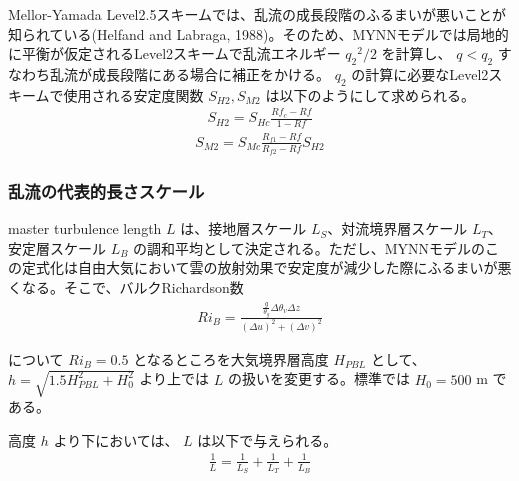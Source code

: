 Mellor-Yamada
Level2.5スキームでは、乱流の成長段階のふるまいが悪いことが知られている(Helfand
and Labraga,
1988)。そのため、MYNNモデルでは局地的に平衡が仮定されるLevel2スキームで乱流エネルギー
\({q_2}^2/2\) を計算し、 \(q<q_2\)
すなわち乱流が成長段階にある場合に補正をかける。 \(q_2\)
の計算に必要なLevel2スキームで使用される安定度関数 \(S_{H2},S_{M2}\)
は以下のようにして求められる。 \begin{eqnarray}S_{H2}=S_{Hc}\frac{Rf_c-Rf}{1-Rf}\end{eqnarray}
\begin{eqnarray}S_{M2}=S_{Mc}\frac{R_{f1}-Rf}{R_{f2}-Rf}S_{H2}\end{eqnarray}

\hypertarget{ux4e71ux6d41ux306eux4ee3ux8868ux7684ux9577ux3055ux30b9ux30b1ux30fcux30eb}{%
\subsubsection{乱流の代表的長さスケール}\label{ux4e71ux6d41ux306eux4ee3ux8868ux7684ux9577ux3055ux30b9ux30b1ux30fcux30eb}}

master turbulence length \(L\) は、接地層スケール
\(L_S\)、対流境界層スケール \(L_T\)、安定層スケール \(L_B\)
の調和平均として決定される。ただし、MYNNモデルのこの定式化は自由大気において雲の放射効果で安定度が減少した際にふるまいが悪くなる。そこで、バルクRichardson数
\begin{eqnarray}Ri_B=\frac{\frac{g}{\theta_g}\Delta\theta_v\Delta z}{(\Delta u)^2+(\Delta v)^2}\end{eqnarray}

について \(Ri_B=0.5\) となるところを大気境界層高度 \(H_{PBL}\) として、
\(h=\sqrt{1.5H_{PBL}^2+H_0^2}\) より上では \(L\)
の扱いを変更する。標準では \(H_0=500\) m である。

高度 \(h\) より下においては、 \(L\) は以下で与えられる。
\begin{eqnarray}\frac{1}{L}=\frac{1}{L_S}+\frac{1}{L_T}+\frac{1}{L_B}\end{eqnarray}

